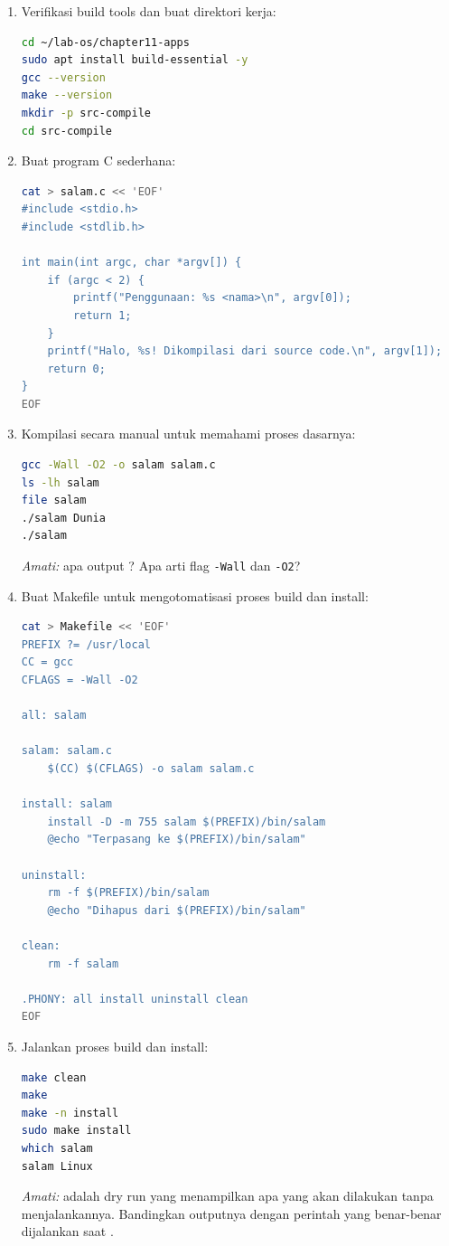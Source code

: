 \begin{enumerate}
    \item Verifikasi build tools dan buat direktori kerja:
\begin{lstlisting}[language=bash, caption={Persiapan lingkungan kompilasi}]
cd ~/lab-os/chapter11-apps
sudo apt install build-essential -y
gcc --version
make --version
mkdir -p src-compile
cd src-compile
\end{lstlisting}

    \item Buat program C sederhana:
\begin{lstlisting}[language=bash, caption={Membuat Source Code Program C}]
cat > salam.c << 'EOF'
#include <stdio.h>
#include <stdlib.h>

int main(int argc, char *argv[]) {
    if (argc < 2) {
        printf("Penggunaan: %s <nama>\n", argv[0]);
        return 1;
    }
    printf("Halo, %s! Dikompilasi dari source code.\n", argv[1]);
    return 0;
}
EOF
\end{lstlisting}

    \item Kompilasi secara manual untuk memahami proses dasarnya:
\begin{lstlisting}[language=bash, caption={Kompilasi manual dengan gcc}]
gcc -Wall -O2 -o salam salam.c
ls -lh salam
file salam
./salam Dunia
./salam
\end{lstlisting}
    \textit{Amati:} apa output ? Apa arti flag \texttt{-Wall}
    dan \texttt{-O2}?

    \item Buat Makefile untuk mengotomatisasi proses build dan install:
\begin{lstlisting}[language=bash, caption={Membuat Makefile dengan target install dan uninstall}]
cat > Makefile << 'EOF'
PREFIX ?= /usr/local
CC = gcc
CFLAGS = -Wall -O2

all: salam

salam: salam.c
	$(CC) $(CFLAGS) -o salam salam.c

install: salam
	install -D -m 755 salam $(PREFIX)/bin/salam
	@echo "Terpasang ke $(PREFIX)/bin/salam"

uninstall:
	rm -f $(PREFIX)/bin/salam
	@echo "Dihapus dari $(PREFIX)/bin/salam"

clean:
	rm -f salam

.PHONY: all install uninstall clean
EOF
\end{lstlisting}

    \item Jalankan proses build dan install:
\begin{lstlisting}[language=bash, caption={Build dan install dengan Makefile}]
make clean
make
make -n install
sudo make install
which salam
salam Linux
\end{lstlisting}
    \textit{Amati:}  adalah dry run yang menampilkan apa yang
    akan dilakukan tanpa menjalankannya. Bandingkan outputnya dengan perintah
    yang benar-benar dijalankan saat .


\end{enumerate}
